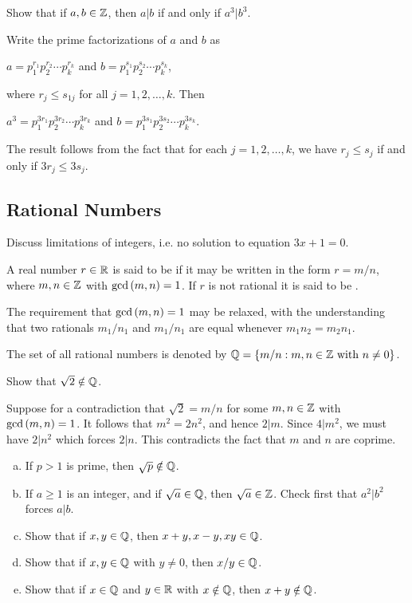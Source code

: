 \documentclass[11pt,fleqn,dvipsnames,usenames]{article}
\newcommand{\p}{\noindent}
\begin{document}
\begin{example}
Show that if $a,b\in\mathbb{Z}$, then $a|b$ if and only if $a^3|b^3$.
\end{example}

\solution Write the prime factorizations of $a$ and $b$ as
\begin{center}
$a = p_{1}^{r_{1}}p_{2}^{r_{2}}\cdots p_{k}^{r_{k}}$ and $b = p_{1}^{s_{1}}p_{2}^{s_{2}}\cdots p_{k}^{s_{k}}$,
\end{center}
where $r_{j}\leq s_{1j}$ for all $j = 1,2,\ldots, k$.  Then
\begin{center}
$a^{3} = p_{1}^{3r_{1}}p_{2}^{3r_{2}}\cdots p_{k}^{3r_{k}}$ and $b = p_{1}^{3s_{1}}p_{2}^{3s_{2}}\cdots p_{k}^{3s_{k}}$.
\end{center}
The result follows from the fact that for each $j=1,2,\ldots, k$, we have $r_{j}\leq s_{j}$ if and only if $3r_{j}\leq 3s_{j}$.
\vsp

\subsection{Rational Numbers}

\p Discuss limitations of integers, i.e. no solution to equation $3x + 1 = 0$.
\vsp

\recall A real number $r\in\mathbb{R}$ is said to be  if it may be written in the form $r = m/n$, where $m,n\in\mathbb{Z}$ with $\text{gcd}\left(m, n\right) = 1$.  If $r$ is not rational it is said to be .
\vsp

\begin{remark}
The requirement that $\text{gcd}\left(m,n\right) = 1$ may be relaxed, with the understanding that two rationals $m_{1}/n_{1}$ and $m_{1}/n_{1}$ are equal whenever $m_{1}n_{2} = m_{2}n_{1}$.
\end{remark}

\notation The set of all rational numbers is denoted by $\mathbb{Q} = \left\{m/n:m,n\in\mathbb{Z}\text{ with } n\neq 0\right\}$.
\vsp

\begin{example}
Show that $\sqrt{2} \notin \mathbb{Q}$.
\end{example}

\solution Suppose for a contradiction that $\sqrt{2} = m/n$ for some $m,n\in\mathbb{Z}$ with $\text{gcd}\left(m, n\right) = 1$.  It follows that $m^2 = 2n^2$, and hence $2|m$.  Since $4|m^2$, we must have $2|n^2$ which forces $2|n$.  This contradicts the fact that $m$ and $n$ are coprime.
\vsp

\exercises
\begin{enumerate}[(a)]
\item If $p > 1$ is prime, then $\sqrt{p}\notin\mathbb{Q}$.
\item If $a\geq 1$ is an integer, and if $\sqrt{a}\in \mathbb{Q}$, then $\sqrt{a}\in\mathbb{Z}$.  \hint Check first that $a^2|b^2$ forces $a|b$.
\item Show that if $x,y\in\mathbb{Q}$, then $x+y, x-y, xy\in\mathbb{Q}$.
\item Show that if $x,y\in\mathbb{Q}$ with $y\neq 0$, then $x/y\in\mathbb{Q}$.
\item Show that if $x\in\mathbb{Q}$ and $y\in\mathbb{R}$ with $x\notin\mathbb{Q}$, then $x+y\notin\mathbb{Q}$.
\end{enumerate}
\vsp
\end{document}

